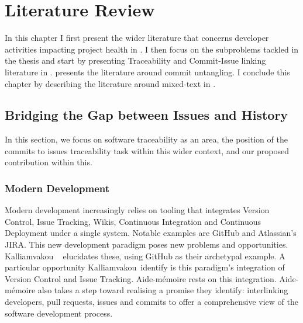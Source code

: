 \chapter{Literature Review}
\label{chapter:literature}

In this chapter I first present the wider literature that concerns developer
activities impacting project health in . I then focus on the
subproblems tackled in the thesis and start by presenting Traceability and
Commit-Issue linking literature in .
 presents the literature around
commit untangling. I conclude this chapter by describing the literature around
mixed-text in .

\section{Bridging the Gap between Issues and History}
\label{chapter:literature:sec:am_rel_work}

In this section, we focus on software traceability as an area, the position of
the commits to issues traceability task within this wider context, and our
proposed contribution within this.

\subsection{Modern Development}
\label{chapter:literature:sec:am_rel_work:modern_dev}

Modern development increasingly relies on tooling that integrates Version
Control, Issue Tracking, Wikis, Continuous Integration and Continuous Deployment
under a single system. Notable examples are GitHub and Atlassian's JIRA. This
new development paradigm poses new problems and opportunities. Kalliamvakou
\etal~\cite{Kalliamvakou2014} elucidates these, using GitHub as their archetypal
example. A particular opportunity Kalliamvakou~\etal identify is this paradigm's
integration of Version Control and Issue Tracking. Aide-mémoire rests on this
integration. Aide-mémoire also takes a step toward realising a promise they
identify:  interlinking developers, pull requests, issues and commits to offer a
comprehensive view of the software development process. 


